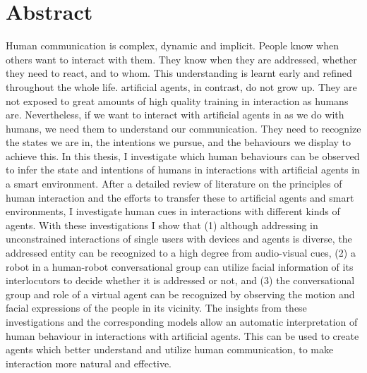 

\chapter*{Abstract}%

Human communication is complex, dynamic and implicit.
People know when others want to interact with them. 
They know when they are addressed, whether they need to react, and to whom.
This understanding is learnt early and refined throughout the whole life.
\Glspl{artificial agent}, in contrast, do not grow up.
They are not exposed to great amounts of high quality training in interaction as humans are.
Nevertheless, if we want to interact with \glspl{artificial agent} in as we do with humans, we need them to understand our communication.
They need to recognize the states we are in, the intentions we pursue, and the behaviours we display to achieve this.
In this thesis, I investigate which human behaviours can be observed to infer the  state and intentions of humans in interactions with \glspl{artificial agent} in a \gls{smart environment}.
After a detailed review of literature on the principles of human interaction and the efforts to transfer these to \glspl{artificial agent} and \glspl{smart environment}, I investigate human  cues in interactions with different kinds of agents.
With these investigations I show that 
(1) although addressing in unconstrained interactions of single users with \glspl{device} and agents is diverse, the addressed entity can be recognized to a high degree from audio-visual cues,
(2) a \gls{robot} in a human-\gls{robot} \gls{conversational group} can utilize facial information of its interlocutors to decide whether it is addressed or not, and
(3) the \gls{conversational group} and role of a \gls{virtual agent} can be recognized by observing the motion and facial expressions of the people in its vicinity.
The insights from these investigations and the corresponding models allow an automatic interpretation of human  behaviour in interactions with \glspl{artificial agent}.
This can be used to create agents which better understand and utilize human communication, to make interaction more natural and effective.

\thispagestyle{empty}

\cleardoublepage
